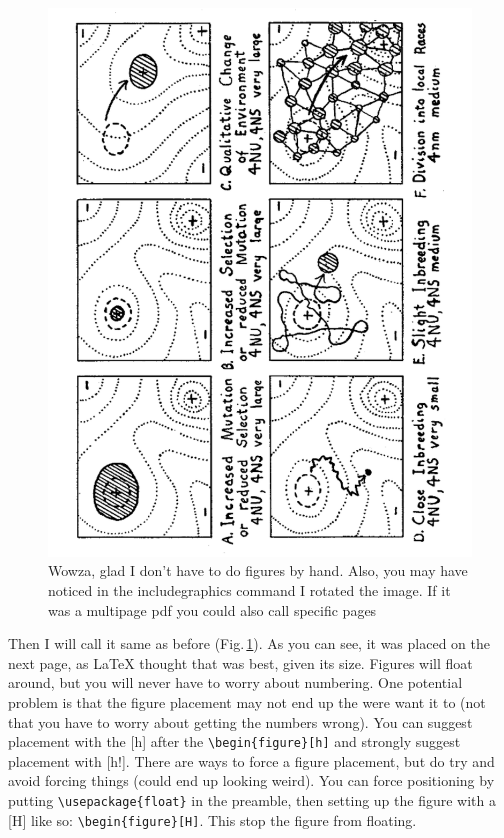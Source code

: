 \begin{figure}[t] 
	\centering
	\includegraphics[scale=0.5, angle=-90]{Figs/Wright_1932_2.pdf}
    \caption[selection]{Wowza, glad I don't have to do figures by hand. Also, you may have noticed in the includegraphics command I rotated the image. If it was a multipage pdf you could also call specific pages}
    \label{bigFig}
\end{figure}

Then I will call it same as before (Fig.\,\ref{bigFig}). As you can see, it was placed on the next page, as \LaTeX{} thought that was best, given its size. Figures will float around, but you will never have to worry about numbering. One potential problem is that the figure placement may not end up the were want it to (not that you have to worry about getting the numbers wrong). You can suggest placement with the [h] after the \verb+\begin{figure}[h]+ and strongly suggest placement with [h!]. There are ways to force a figure placement, but do try and avoid forcing things (could end up looking weird). You can force positioning by putting \verb+\usepackage{float}+ in the preamble, then setting up the figure with a [H] like so: \verb+\begin{figure}[H]+. This stop the figure from floating.

